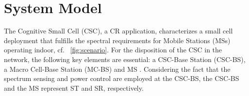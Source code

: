 \section{System Model} \label{sec:sys_mod}
The Cognitive Small Cell (CSC), a CR application, characterizes a small cell deployment that fulfills the spectral requirements for Mobile Stations (MSs) operating indoor, cf. \figurename~\ref{fig:scenario}.
For the disposition of the CSC in the network, the following key elements are essential: a CSC-Base Station (CSC-BS), a Macro Cell-Base Station (MC-BS) and MS \cite{Kaushik16}.
Considering the fact that the spectrum sensing and power control are employed at the CSC-BS, the CSC-BS and the MS represent ST and SR, respectively.

